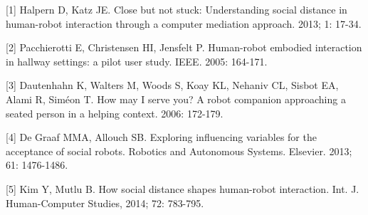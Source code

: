 \documentclass[a4paper]{article}
\begin{document}
\begin{description}
%
%
{\footnotesize \item{[1]} Halpern D, Katz JE. Close but not stuck: Understanding social distance in human-robot interaction through a computer mediation approach. 2013; 1: 17-34.
%
\item{[2]} Pacchierotti E, Christensen HI, Jensfelt P. Human-robot embodied interaction in hallway settings: a pilot user study. IEEE. 2005: 164-171.
%
\item{[3]} Dautenhahn K, Walters M, Woods S, Koay KL, Nehaniv CL, Sisbot EA, Alami R, Sim{\'e}on T. How may I serve you? A robot companion approaching a seated person in a helping context. 2006: 172-179.
%
\item{[4]} De Graaf MMA, Allouch SB. Exploring influencing variables for the acceptance of social robots. Robotics and Autonomous Systems. Elsevier. 2013; 61: 1476-1486.
%
\item{[5]} Kim Y, Mutlu B. How social distance shapes human-robot interaction. Int. J. Human-Computer Studies, 2014; 72: 783-795.
}
\end{description}
\end{document}
